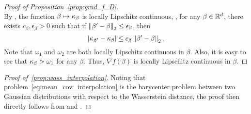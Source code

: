 \documentclass{article}
\begin{document}
\begin{proof}[Proof of Proposition~\ref{prop:grad_f_D}]
\begin{equation*}
\end{equation*}
By \citet[Theorem 6.5]{still2018lectures}, the function $\beta \mapsto \kappa_\beta$ is locally Lipschitz continuous, \ie, for any $\beta\in \mathbb{R}^d$, there exists $c_\beta,\epsilon_\beta > 0$ such that if $\left\|\beta' - \beta\right\|_2 \le \epsilon_\beta$, then
\begin{equation*}\label{ineq:gamma_Lip}
|\kappa_{\beta'} - \kappa_{\beta}| \le c_\beta \left\| \beta' - \beta \right\|_2.
\end{equation*}
Note that $\omega_1$ and $\omega_2 $ are both locally Lipschitz continuous in $\beta$. Also, it is easy to see that $\kappa_\beta > \omega_1 $ for any $\beta$. Thus, $\nabla f (\beta)$ is locally Lipschitz continuous in $\beta$.
\end{proof}


\begin{proof}[Proof of~\ref{prop:wass_interpolation}]
Noting that problem~\eqref{eq:mean_cov_interpolation} is the barycenter problem between two Gaussian distributions with respect to the Wasserstein distance, the proof then directly follows from \citet[\S6.2]{agueh2011barycenters} and \citet[Example~1.7]{ref:mccann1997convexity}.
\end{proof}
\end{document}
